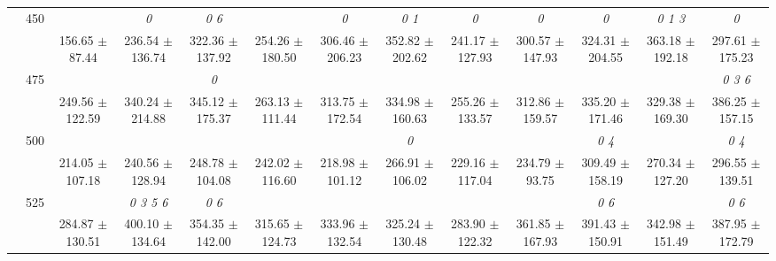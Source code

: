 \begin{table}[h]
{\begin{tabular}{
        ccccccccccccc}
 & \multirow{2}{*}{450}& & \textit{ 0 }& \textit{ 0 6 }& & \textit{ 0 }& \textit{ 0 1 }& \textit{ 0 }& \textit{ 0 }& \textit{ 0 }& \textit{ 0 1 3 }& \textit{ 0 } \\ 
 & & 156.65 $\pm$ 87.44& 236.54 $\pm$ 136.74& 322.36 $\pm$ 137.92& 254.26 $\pm$ 180.50& 306.46 $\pm$ 206.23& 352.82 $\pm$ 202.62& 241.17 $\pm$ 127.93& 300.57 $\pm$ 147.93& 324.31 $\pm$ 204.55& 363.18 $\pm$ 192.18& 297.61 $\pm$ 175.23 \\ 
 & \multirow{2}{*}{475}& \cellcolor[HTML]{EFEFEF} & \cellcolor[HTML]{EFEFEF} & \cellcolor[HTML]{EFEFEF} \textit{ 0 }& \cellcolor[HTML]{EFEFEF} & \cellcolor[HTML]{EFEFEF} & \cellcolor[HTML]{EFEFEF} & \cellcolor[HTML]{EFEFEF} & \cellcolor[HTML]{EFEFEF} & \cellcolor[HTML]{EFEFEF} & \cellcolor[HTML]{EFEFEF} & \cellcolor[HTML]{EFEFEF} \textit{ 0 3 6 } \\ 
 & & \cellcolor[HTML]{EFEFEF} 249.56 $\pm$ 122.59& \cellcolor[HTML]{EFEFEF} 340.24 $\pm$ 214.88& \cellcolor[HTML]{EFEFEF} 345.12 $\pm$ 175.37& \cellcolor[HTML]{EFEFEF} 263.13 $\pm$ 111.44& \cellcolor[HTML]{EFEFEF} 313.75 $\pm$ 172.54& \cellcolor[HTML]{EFEFEF} 334.98 $\pm$ 160.63& \cellcolor[HTML]{EFEFEF} 255.26 $\pm$ 133.57& \cellcolor[HTML]{EFEFEF} 312.86 $\pm$ 159.57& \cellcolor[HTML]{EFEFEF} 335.20 $\pm$ 171.46& \cellcolor[HTML]{EFEFEF} 329.38 $\pm$ 169.30& \cellcolor[HTML]{EFEFEF} 386.25 $\pm$ 157.15 \\ 
 & \multirow{2}{*}{500}& & & & & & \textit{ 0 }& & & \textit{ 0 4 }& & \textit{ 0 4 } \\ 
 & & 214.05 $\pm$ 107.18& 240.56 $\pm$ 128.94& 248.78 $\pm$ 104.08& 242.02 $\pm$ 116.60& 218.98 $\pm$ 101.12& 266.91 $\pm$ 106.02& 229.16 $\pm$ 117.04& 234.79 $\pm$ 93.75& 309.49 $\pm$ 158.19& 270.34 $\pm$ 127.20& 296.55 $\pm$ 139.51 \\ 
 & \multirow{2}{*}{525}& \cellcolor[HTML]{EFEFEF} & \cellcolor[HTML]{EFEFEF} \textit{ 0 3 5 6 }& \cellcolor[HTML]{EFEFEF} \textit{ 0 6 }& \cellcolor[HTML]{EFEFEF} & \cellcolor[HTML]{EFEFEF} & \cellcolor[HTML]{EFEFEF} & \cellcolor[HTML]{EFEFEF} & \cellcolor[HTML]{EFEFEF} & \cellcolor[HTML]{EFEFEF} \textit{ 0 6 }& \cellcolor[HTML]{EFEFEF} & \cellcolor[HTML]{EFEFEF} \textit{ 0 6 } \\ 
 & & \cellcolor[HTML]{EFEFEF} 284.87 $\pm$ 130.51& \cellcolor[HTML]{EFEFEF} 400.10 $\pm$ 134.64& \cellcolor[HTML]{EFEFEF} 354.35 $\pm$ 142.00& \cellcolor[HTML]{EFEFEF} 315.65 $\pm$ 124.73& \cellcolor[HTML]{EFEFEF} 333.96 $\pm$ 132.54& \cellcolor[HTML]{EFEFEF} 325.24 $\pm$ 130.48& \cellcolor[HTML]{EFEFEF} 283.90 $\pm$ 122.32& \cellcolor[HTML]{EFEFEF} 361.85 $\pm$ 167.93& \cellcolor[HTML]{EFEFEF} 391.43 $\pm$ 150.91& \cellcolor[HTML]{EFEFEF} 342.98 $\pm$ 151.49& \cellcolor[HTML]{EFEFEF} 387.95 $\pm$ 172.79 \\ 

\end{tabular}}
\end{table}
